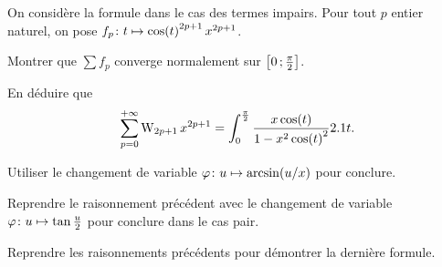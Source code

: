 \begin{exercice}
On considère la formule dans le cas des termes impairs. Pour tout $p$ entier naturel, on pose $\fonctionligne[f_p]{t}{\cos(t)^{2p+1} \, x^{2p+1}}$.
\begin{questions}
\item Montrer que $\sum f_p$ converge normalement sur $\interff{0}{\frac{\pi}{2}}$.

\item En déduire que
\[
\sum_{p=0}^{+\infty} \Wallis_{2p+1} \, x^{2p+1} = \int_0^{\frac{\pi}{2}} \frac{x \cos(t)}{1 - x^2 \cos(t)^2} \d t.
\]

\item Utiliser le changement de variable $\fonctionligne[\varphi]{u}{\arcsin(u/x)}$ pour conclure.

\item Reprendre le raisonnement précédent avec le changement de variable $\fonctionligne[\varphi]{u}{\tan\frac{u}{2}}$ pour conclure dans le cas pair.

\item Reprendre les raisonnements précédents pour démontrer la dernière formule.
\end{questions}
\end{exercice}

